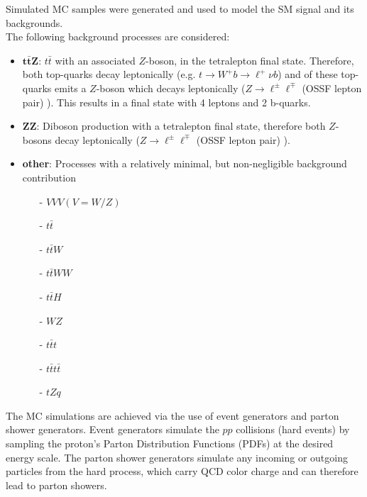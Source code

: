 Simulated MC samples were generated and used to model the SM \tWZ signal and its backgrounds.\\

The following background processes are considered:
\begin{itemize}
	\item $\mathbf{t \bar{t} Z}$: $t \bar{t} $  with an associated $Z$-boson, in the tetralepton final state. Therefore, both top-quarks decay leptonically (e.g. $t \rightarrow W^+ b \rightarrow \ell^+ \nu b$) and of these top-quarks emits a $Z$-boson which decays leptonically ($Z \rightarrow \ell^\pm \ell^\mp$ (OSSF lepton pair) ). This results in a final state with 4 leptons and 2 b-quarks.
	\item $\mathbf{ZZ}$: Diboson production with a tetralepton final state, therefore both $Z$-bosons decay leptonically ($Z \rightarrow \ell^\pm \ell^\mp$ (OSSF lepton pair) ).
	\item \textbf{other}: Processes with a relatively minimal, but non-negligible background contribution
	\begin{itemize}
	\item [-] $VVV (V=W/Z)$
	\item [-] $t\bar{t}$
	\item [-] $t\bar{t}W$
	\item [-] $t\bar{t}WW$
	\item [-] $t\bar{t}H$
	\item [-] $WZ$
	\item [-] $t\bar{t}t$
	\item [-] $t\bar{t}t\bar{t}$
	\item [-] $tZq$
	\end{itemize}
\end{itemize}

The MC simulations are achieved via the use of event generators and parton shower generators. Event generators simulate the $pp$ collisions (hard events) by sampling the proton's Parton Distribution Functions (PDFs) at the desired energy scale. The parton shower generators simulate any incoming or outgoing particles from the hard process, which carry QCD color charge and can therefore lead to parton showers.\\

